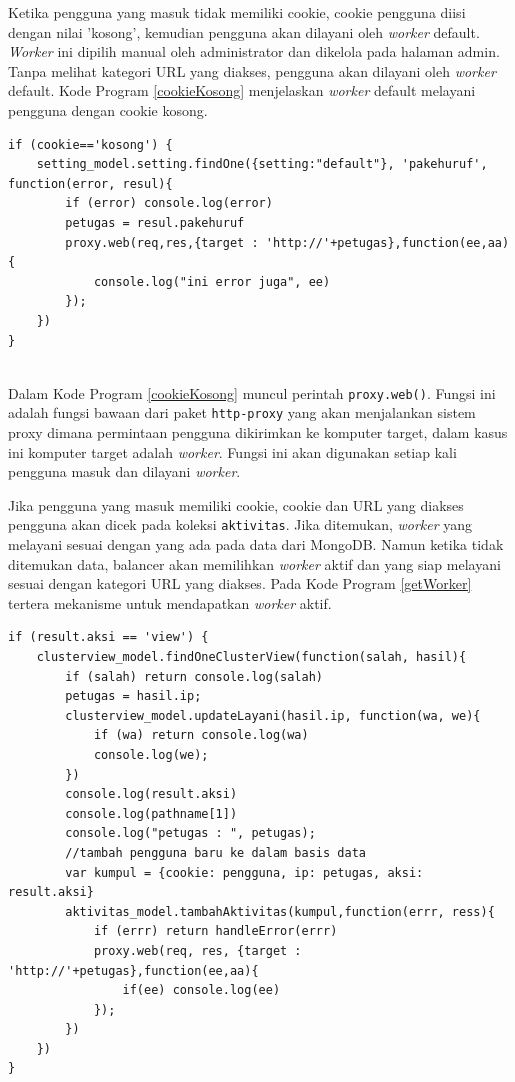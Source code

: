 \documentclass{ta-its}
\begin{document}
				Ketika pengguna yang masuk tidak memiliki cookie, cookie pengguna diisi dengan nilai 'kosong', kemudian pengguna akan dilayani oleh \textit{worker} default. \textit{Worker} ini dipilih manual oleh administrator dan dikelola pada halaman admin. Tanpa melihat kategori URL yang diakses, pengguna akan dilayani oleh \textit{worker} default. Kode Program \ref{cookieKosong} menjelaskan \textit{worker} default melayani pengguna dengan cookie kosong. 
				
				\begin{lstlisting}[frame=single,tabsize=2,breaklines,caption={Worker Default Melayani Cookie Kosong},label=cookieKosong]
if (cookie=='kosong') {
	setting_model.setting.findOne({setting:"default"}, 'pakehuruf', function(error, resul){
		if (error) console.log(error)				
		petugas = resul.pakehuruf
		proxy.web(req,res,{target : 'http://'+petugas},function(ee,aa){
			console.log("ini error juga", ee)
		});
	})
}
				
				\end{lstlisting}
				
				Dalam Kode Program \ref{cookieKosong} muncul perintah \texttt{proxy.web()}. Fungsi ini adalah fungsi bawaan dari paket \texttt{http-proxy} yang akan menjalankan sistem proxy dimana permintaan pengguna dikirimkan ke komputer target, dalam kasus ini komputer target adalah \textit{worker}. Fungsi ini akan digunakan setiap kali pengguna masuk dan dilayani \textit{worker}.
				
				Jika pengguna yang masuk memiliki cookie, cookie dan URL yang diakses pengguna akan dicek pada koleksi \texttt{aktivitas}. Jika ditemukan, \textit{worker} yang melayani sesuai dengan yang ada pada data dari MongoDB. Namun ketika tidak ditemukan data, balancer akan memilihkan \textit{worker} aktif dan yang siap melayani sesuai dengan kategori URL yang diakses. Pada Kode Program \ref{getWorker} tertera mekanisme untuk mendapatkan \textit{worker} aktif.
				
				\begin{lstlisting}[frame=single,tabsize=2,breaklines,caption={Mekanisme Pencarian Worker Aktif},label=getWorker]
if (result.aksi == 'view') {
	clusterview_model.findOneClusterView(function(salah, hasil){
		if (salah) return console.log(salah)
		petugas = hasil.ip;
		clusterview_model.updateLayani(hasil.ip, function(wa, we){
			if (wa) return console.log(wa)
			console.log(we);
		})
		console.log(result.aksi)
		console.log(pathname[1])
		console.log("petugas : ", petugas);
		//tambah pengguna baru ke dalam basis data
		var kumpul = {cookie: pengguna, ip: petugas, aksi: result.aksi}
		aktivitas_model.tambahAktivitas(kumpul,function(errr, ress){
			if (errr) return handleError(errr)
			proxy.web(req, res, {target : 'http://'+petugas},function(ee,aa){
				if(ee) console.log(ee)
			});
		})
	})
}
				
				\end{lstlisting}
				
\end{document}
